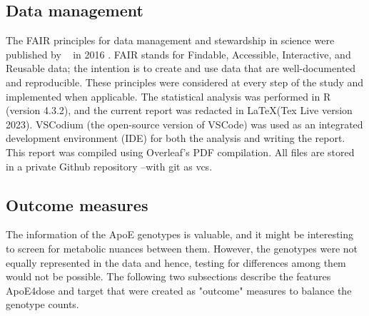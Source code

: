 \documentclass{amsart}
\begin{document}
\subsection{Data management}\label{datamanagement}
The FAIR principles for data management and stewardship in science were published by  ~\citeauthor{Wilkinson2016TheStewardship} in 2016 \cite{Wilkinson2016TheStewardship}. FAIR stands for Findable, Accessible, Interactive, and Reusable data; the intention is to create and use data that are well-documented and reproducible. These principles were considered at every step of the study and implemented when applicable. The statistical analysis was performed in R (version 4.3.2), and the current report was redacted in \LaTeX  (Tex Live version 2023). VSCodium (the open-source version of VSCode) was used as an integrated development environment (IDE) for both the analysis and writing the report. This report was compiled using Overleaf's PDF compilation. All files are stored in a private Github repository --with git as \acrfull{vcs}.

\subsection{Outcome measures}\label{featureeng}
The information of the ApoE genotypes is valuable, and it might be interesting to screen for metabolic nuances between them. However, the genotypes were not equally represented in the data and hence, testing for differences among them would not be possible. The following two subsections describe the features ApoE4dose and target that were created as "outcome" measures to balance the genotype counts.
\end{document}
